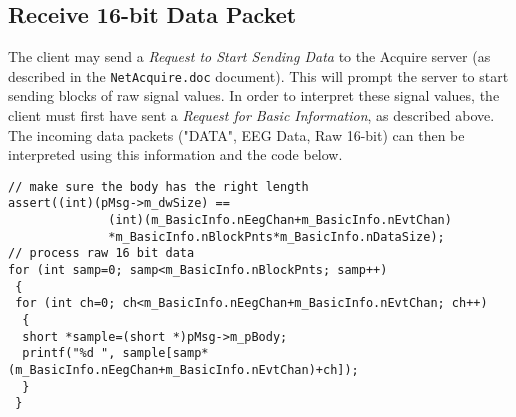 \documentclass[letterpaper, oneside, 12pt]{article}
\begin{document}
\subsection{Receive 16-bit Data Packet}

The client may send a \emph{Request to Start Sending Data} to the Acquire server 
(as described in the \texttt{NetAcquire.doc} document). This will prompt the 
server to start sending blocks of raw signal values. In order to interpret these 
signal values, the client must first have sent a \emph{Request for Basic 
Information}, as described above. The incoming data packets ("DATA", EEG Data, 
Raw 16-bit) can then be interpreted using this information and the code below.

\begin{verbatim}
// make sure the body has the right length
assert((int)(pMsg->m_dwSize) == 
              (int)(m_BasicInfo.nEegChan+m_BasicInfo.nEvtChan)
              *m_BasicInfo.nBlockPnts*m_BasicInfo.nDataSize);
// process raw 16 bit data
for (int samp=0; samp<m_BasicInfo.nBlockPnts; samp++)
 {
 for (int ch=0; ch<m_BasicInfo.nEegChan+m_BasicInfo.nEvtChan; ch++)
  {
  short *sample=(short *)pMsg->m_pBody;
  printf("%d ", sample[samp*(m_BasicInfo.nEegChan+m_BasicInfo.nEvtChan)+ch]);
  }
 }
\end{verbatim}


\end{document}
